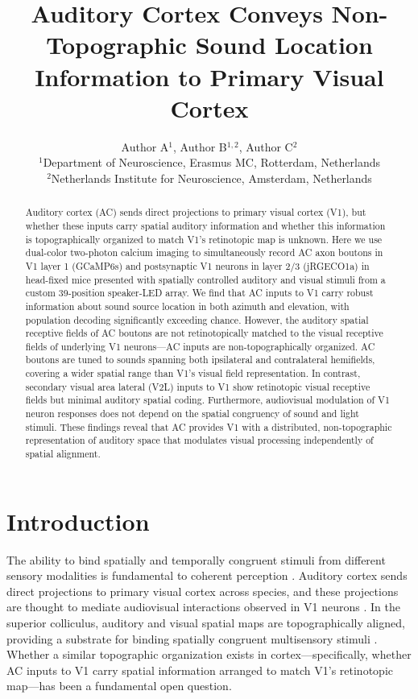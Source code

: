 \documentclass[11pt]{article}
\title{Auditory Cortex Conveys Non-Topographic Sound Location Information to Primary Visual Cortex}
\author{Author A$^{1}$, Author B$^{1,2}$, Author C$^{2}$ \\
\small $^{1}$Department of Neuroscience, Erasmus MC, Rotterdam, Netherlands \\
\small $^{2}$Netherlands Institute for Neuroscience, Amsterdam, Netherlands}
\date{}
\begin{document}
\maketitle

\begin{abstract}
Auditory cortex (AC) sends direct projections to primary visual cortex (V1), but whether these inputs carry spatial auditory information and whether this information is topographically organized to match V1's retinotopic map is unknown. Here we use dual-color two-photon calcium imaging to simultaneously record AC axon boutons in V1 layer 1 (GCaMP6s) and postsynaptic V1 neurons in layer 2/3 (jRGECO1a) in head-fixed mice presented with spatially controlled auditory and visual stimuli from a custom 39-position speaker-LED array. We find that AC inputs to V1 carry robust information about sound source location in both azimuth and elevation, with population decoding significantly exceeding chance. However, the auditory spatial receptive fields of AC boutons are not retinotopically matched to the visual receptive fields of underlying V1 neurons---AC inputs are non-topographically organized. AC boutons are tuned to sounds spanning both ipsilateral and contralateral hemifields, covering a wider spatial range than V1's visual field representation. In contrast, secondary visual area lateral (V2L) inputs to V1 show retinotopic visual receptive fields but minimal auditory spatial coding. Furthermore, audiovisual modulation of V1 neuron responses does not depend on the spatial congruency of sound and light stimuli. These findings reveal that AC provides V1 with a distributed, non-topographic representation of auditory space that modulates visual processing independently of spatial alignment.
\end{abstract}

\section{Introduction}

The ability to bind spatially and temporally congruent stimuli from different sensory modalities is fundamental to coherent perception \citep{stein2012new}. Auditory cortex sends direct projections to primary visual cortex across species, and these projections are thought to mediate audiovisual interactions observed in V1 neurons \citep{iurilli2012sound, ibrahim2016cross}. In the superior colliculus, auditory and visual spatial maps are topographically aligned, providing a substrate for binding spatially congruent multisensory stimuli \citep{king2004superior}. Whether a similar topographic organization exists in cortex---specifically, whether AC inputs to V1 carry spatial information arranged to match V1's retinotopic map---has been a fundamental open question.
\end{document}
